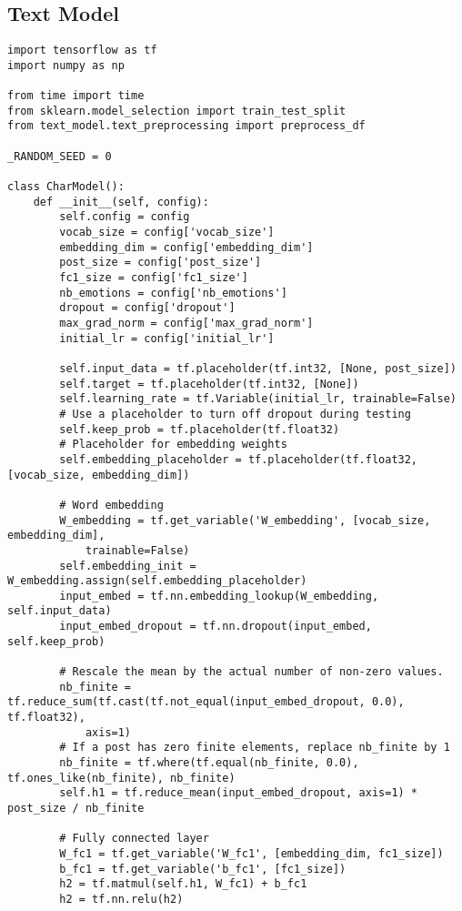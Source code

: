\subsection{Text Model}
\begin{lstlisting}
import tensorflow as tf
import numpy as np

from time import time
from sklearn.model_selection import train_test_split
from text_model.text_preprocessing import preprocess_df

_RANDOM_SEED = 0

class CharModel():
    def __init__(self, config):
        self.config = config
        vocab_size = config['vocab_size']
        embedding_dim = config['embedding_dim']
        post_size = config['post_size']
        fc1_size = config['fc1_size']
        nb_emotions = config['nb_emotions']
        dropout = config['dropout']
        max_grad_norm = config['max_grad_norm']
        initial_lr = config['initial_lr']
        
        self.input_data = tf.placeholder(tf.int32, [None, post_size])
        self.target = tf.placeholder(tf.int32, [None])
        self.learning_rate = tf.Variable(initial_lr, trainable=False)
        # Use a placeholder to turn off dropout during testing 
        self.keep_prob = tf.placeholder(tf.float32)
        # Placeholder for embedding weights
        self.embedding_placeholder = tf.placeholder(tf.float32, [vocab_size, embedding_dim])
        
        # Word embedding
        W_embedding = tf.get_variable('W_embedding', [vocab_size, embedding_dim], 
            trainable=False)
        self.embedding_init = W_embedding.assign(self.embedding_placeholder)
        input_embed = tf.nn.embedding_lookup(W_embedding, self.input_data)
        input_embed_dropout = tf.nn.dropout(input_embed, self.keep_prob)

        # Rescale the mean by the actual number of non-zero values.
        nb_finite = tf.reduce_sum(tf.cast(tf.not_equal(input_embed_dropout, 0.0), tf.float32), 
            axis=1)
        # If a post has zero finite elements, replace nb_finite by 1
        nb_finite = tf.where(tf.equal(nb_finite, 0.0), tf.ones_like(nb_finite), nb_finite)
        self.h1 = tf.reduce_mean(input_embed_dropout, axis=1) * post_size / nb_finite

        # Fully connected layer
        W_fc1 = tf.get_variable('W_fc1', [embedding_dim, fc1_size])
        b_fc1 = tf.get_variable('b_fc1', [fc1_size])
        h2 = tf.matmul(self.h1, W_fc1) + b_fc1
        h2 = tf.nn.relu(h2)


\end{lstlisting}
